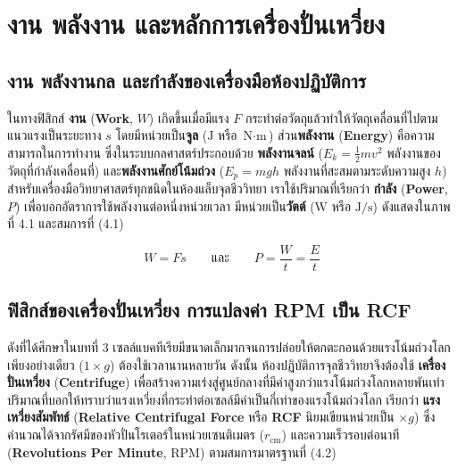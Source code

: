 \clearpage

\chapter{งาน พลังงาน และหลักการเครื่องปั่นเหวี่ยง}

\section{งาน พลังงานกล และกำลังของเครื่องมือห้องปฏิบัติการ}


ในทางฟิสิกส์ \textbf{งาน} (\textbf{Work}, $W$) เกิดขึ้นเมื่อมีแรง $F$ กระทำต่อวัตถุแล้วทำให้วัตถุเคลื่อนที่ไปตามแนวแรงเป็นระยะทาง $s$ โดยมีหน่วยเป็น\textbf{จูล} ($\text{J}$ หรือ $\text{N}\cdot\text{m}$) ส่วน\textbf{พลังงาน} (\textbf{Energy}) คือความสามารถในการทำงาน ซึ่งในระบบกลศาสตร์ประกอบด้วย \textbf{พลังงานจลน์} ($E_k = \frac{1}{2}mv^2$ พลังงานของวัตถุที่กำลังเคลื่อนที่) และ\textbf{พลังงานศักย์โน้มถ่วง} ($E_p = mgh$ พลังงานที่สะสมตามระดับความสูง $h$) สำหรับเครื่องมือวิทยาศาสตร์ทุกชนิดในห้องแล็บจุลชีววิทยา เราใช้ปริมาณที่เรียกว่า \textbf{กำลัง} (\textbf{Power}, $P$) เพื่อบอกอัตราการใช้พลังงานต่อหนึ่งหน่วยเวลา มีหน่วยเป็น\textbf{วัตต์} ($\text{W}$ หรือ $\text{J/s}$) ดังแสดงใน\mbox{ภาพที่} 4.1 และสมการที่ (4.1)

\begin{equation}
    W = F s \qquad \text{และ} \qquad P = \frac{W}{t} = \frac{E}{t}
\end{equation}

\section{ฟิสิกส์ของเครื่องปั่นเหวี่ยง การแปลงค่า RPM เป็น RCF}


ดังที่ได้ศึกษาในบทที่ 3 เซลล์แบคทีเรียมีขนาดเล็กมากจนการปล่อยให้ตกตะกอนด้วยแรงโน้มถ่วงโลกเพียงอย่างเดียว ($1\times g$) ต้องใช้เวลานานหลายวัน ดังนั้น ห้องปฏิบัติการจุลชีววิทยาจึงต้องใช้ \textbf{เครื่องปั่นเหวี่ยง} (\textbf{Centrifuge}) เพื่อสร้างความเร่งสู่ศูนย์กลางที่มีค่าสูงกว่าแรงโน้มถ่วงโลกหลายพันเท่า ปริมาณที่บอกให้ทราบว่าแรงเหวี่ยงที่กระทำต่อเซลล์มีค่าเป็นกี่เท่าของแรงโน้มถ่วงโลก เรียกว่า \textbf{แรงเหวี่ยงสัมพัทธ์} (\textbf{Relative Centrifugal Force} หรือ \textbf{RCF} นิยมเขียนหน่วยเป็น $\times g$) ซึ่งคำนวณได้จากรัศมีของหัวปั่นโรเตอร์ในหน่วยเซนติเมตร ($r_{\text{cm}}$) และความเร็วรอบต่อนาที (\textbf{Revolutions Per Minute}, $\text{RPM}$) ตามสมการมาตรฐานที่ (4.2)

